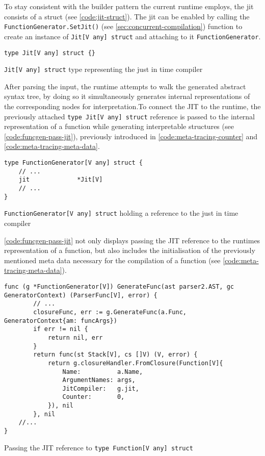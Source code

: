 To stay consistent with the builder pattern the current runtime employs, the
jit consists of a struct (see \autoref{code:jit-struct}). The jit can be
enabled by calling the \texttt{FunctionGenerator.SetJit()} (see
\autoref{sec:concurrent-compilation}) function to create an instance of
\texttt{Jit[V any] struct} and attaching to it
\texttt{FunctionGenerator}. 

\begin{listing}[H]
    \begin{verbatim}
type Jit[V any] struct {}
    \end{verbatim}
    \caption{\texttt{Jit[V any] struct} type representing the just in time compiler}
    \label{code:jit-struct}
\end{listing}

After parsing the input, the runtime attempts to walk the
generated abstract syntax tree, by doing so it simultaneously generates
internal representations of the corresponding nodes for interpretation.To
connect the JIT to the runtime, the previously attached \texttt{type Jit[V any] struct} reference is passed to the internal representation of a
function while generating interpretable structures (see \autoref{code:funcgen-pass-jit}), previously introduced in
\autoref{code:meta-tracing-counter} and
\autoref{code:meta-tracing-meta-data}.

\begin{listing}[H]
    \begin{verbatim}
type FunctionGenerator[V any] struct {
    // ...
    jit             *Jit[V]
    // ...
}
    \end{verbatim}
    \caption{\texttt{FunctionGenerator[V any] struct} holding a reference to the just in time compiler}
    \label{code:funcgen-ref-jit}
\end{listing}

\autoref{code:funcgen-pass-jit} not only displays passing the JIT reference
to the runtimes representation of a function, but also includes the
initialisation of the previously mentioned meta data necessary for the
compilation of a function (see \autoref{code:meta-tracing-meta-data}).

\begin{listing}[H]
    \begin{verbatim}
func (g *FunctionGenerator[V]) GenerateFunc(ast parser2.AST, gc GeneratorContext) (ParserFunc[V], error) {
        // ...
        closureFunc, err := g.GenerateFunc(a.Func, GeneratorContext{am: funcArgs})
        if err != nil {
            return nil, err
        }
        return func(st Stack[V], cs []V) (V, error) {
            return g.closureHandler.FromClosure(Function[V]{
                Name:          a.Name,
                ArgumentNames: args,
                JitCompiler:   g.jit,
                Counter:       0,
            }), nil
        }, nil
    //...
}
    \end{verbatim}
    \caption{Passing the JIT reference to \texttt{type Function[V any] struct}}
    \label{code:funcgen-pass-jit}
\end{listing}


